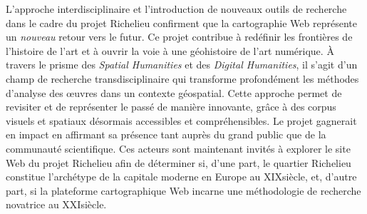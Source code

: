 L'approche interdisciplinaire et l'introduction de nouveaux outils de recherche dans le cadre du projet Richelieu confirment que la cartographie Web représente un \textit{nouveau} retour vers le futur. Ce projet contribue à redéfinir les frontières de l'histoire de l'art et à ouvrir la voie à une géohistoire de l'art numérique. À travers le prisme des \textit{Spatial Humanities} et des \textit{Digital Humanities}, il s'agit d'un champ de recherche transdisciplinaire qui transforme profondément les méthodes d'analyse des œuvres dans un contexte géospatial. Cette approche permet de revisiter et de représenter le passé de manière innovante, grâce à des corpus visuels et spatiaux désormais accessibles et compréhensibles. Le projet gagnerait en impact en affirmant sa présence tant auprès du grand public que de la communauté scientifique. Ces acteurs sont maintenant invités à explorer le site Web du projet Richelieu afin de déterminer si, d'une part, le quartier Richelieu constitue l'archétype de la capitale moderne en Europe au XIX\ieme siècle, et, d'autre part, si la plateforme cartographique Web incarne une méthodologie de recherche novatrice au XXI\ieme  siècle.


